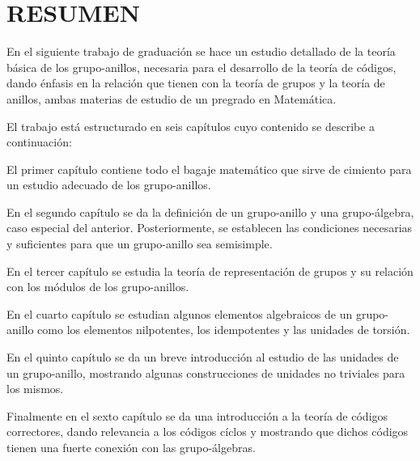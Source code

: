 \chapter*{RESUMEN}
En el siguiente trabajo de graduación se hace un estudio detallado de la teoría básica de los grupo-anillos, necesaria para el desarrollo de la teoría de códigos\textbf{}, dando énfasis en la relación que tienen con la teoría de grupos y la teoría de anillos, ambas materias de estudio de un pregrado en Matemática.

El trabajo está estructurado en seis capítulos cuyo contenido se describe a continuación:

El primer capítulo contiene todo el bagaje matemático que sirve de cimiento para un  estudio adecuado de los grupo-anillos. 

En el segundo capítulo se da la definición de un grupo-anillo y una grupo-álgebra, caso especial del anterior. Posteriormente, se establecen las condiciones necesarias y suficientes para que un grupo-anillo sea semisimple. 

En el tercer capítulo se estudia la teoría de representación de grupos y su relación con los módulos de los grupo-anillos. 

En el cuarto capítulo se estudian algunos elementos algebraicos de un grupo-anillo como los elementos nilpotentes, los idempotentes y las unidades de torsión.

En el quinto capítulo se da un breve introducción al estudio de las unidades de un grupo-anillo, mostrando algunas construcciones de unidades no triviales para los mismos.

Finalmente en el sexto capítulo se da una introducción a la teoría de códigos correctores, dando relevancia a los códigos cíclos y mostrando que dichos códigos tienen una fuerte conexión con las grupo-álgebras.




